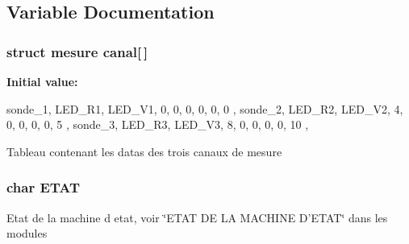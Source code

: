 \subsection{Variable Documentation}
\hypertarget{version__3__1__5__docu_8ino_aefff17cf4a5a87c3d04f604506918d3d}{
\subsubsection[{canal}]{\setlength{\rightskip}{0pt plus 5cm}struct {\bf mesure} {\bf canal}\mbox{[}$\,$\mbox{]}}}
\label{version__3__1__5__docu_8ino_aefff17cf4a5a87c3d04f604506918d3d}
{\bfseries Initial value:}
\begin{DoxyCode}
{
  {sonde_1, LED_R1, LED_V1, 0, 0, 0, 0, 0, 0} ,
  {sonde_2, LED_R2, LED_V2, 4, 0, 0, 0, 0, 5 } ,
  {sonde_3, LED_R3, LED_V3, 8, 0, 0, 0, 0, 10 } , 
}
\end{DoxyCode}
Tableau contenant les datas des trois canaux de mesure \hypertarget{version__3__1__5__docu_8ino_adfa014924a11e5a329bd54ad88bf1ddc}{
\subsubsection[{ETAT}]{\setlength{\rightskip}{0pt plus 5cm}char {\bf ETAT}}}
\label{version__3__1__5__docu_8ino_adfa014924a11e5a329bd54ad88bf1ddc}
Etat de la machine d etat, voir \char`\"{}ETAT DE LA MACHINE D'ETAT\char`\"{} dans les modules 